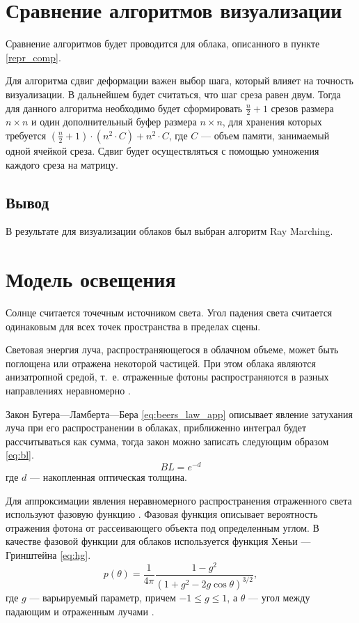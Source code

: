 \section{Сравнение алгоритмов визуализации}

Сравнение алгоритмов будет проводится для облака, описанного в пункте \ref{repr_comp}.

Для алгоритма сдвиг деформации важен выбор шага, который влияет на точность визуализации. В дальнейшем будет считаться, что шаг среза равен двум. Тогда для данного алгоритма необходимо будет сформировать $\frac{n}{2} + 1$ срезов размера $n \times n$ и один дополнительный буфер размера $n \times n$, для хранения которых требуется $(\frac{n}{2} + 1)\cdot(n^2 \cdot C) + n^2 \cdot C$, где $C$ --- объем памяти, занимаемый одной ячейкой среза. Сдвиг будет осуществляться с помощью умножения каждого среза на матрицу.


\subsection*{Вывод}
В результате для визуализации облаков был выбран алгоритм Ray Marching.

\section{Модель освещения}

Солнце считается точечным источником света. Угол падения света считается одинаковым для всех точек пространства в пределах сцены.

Световая энергия луча, распространяющегося в облачном объеме, может быть поглощена или отражена некоторой частицей. При этом облака являются анизатропной средой, т.~е. отраженные фотоны распространяются в разных направлениях неравномерно \cite{clouds, partmedia, hzd, frostbite}.

Закон Бугера---Ламберта---Бера \eqref{eq:beers_law_app} описывает явление затухания луча при его распространении в облаках, приближенно интеграл будет рассчитываться как сумма, тогда закон можно записать следующим образом \eqref{eq:bl}.
\begin{equation}
	\label{eq:bl}
	BL = e ^ {-d}
\end{equation}
где $ d $ --- накопленная оптическая толщина.


Для аппроксимации явления неравномерного распространения отраженного света используют фазовую функцию \cite{partmedia, hzd, frostbite, clouds}.
Фазовая функция описывает вероятность отражения фотона от рассеивающего объекта под определенным углом. 
В качестве фазовой функции для облаков используется функция Хеньи --- Гринштейна \eqref{eq:hg}.  
\begin{equation}
	\label{eq:hg}
	p(\theta) = \frac{1}{4\pi} \frac{1 - g^2}{(1 + g^2 - 2g\cos \theta)^{3/2}},
\end{equation}
где $ g $ --- варьируемый параметр, причем $ -1 \leq g \leq 1 $, а $\theta$ --- угол между падающим и отраженным лучами \cite{clouds}.


